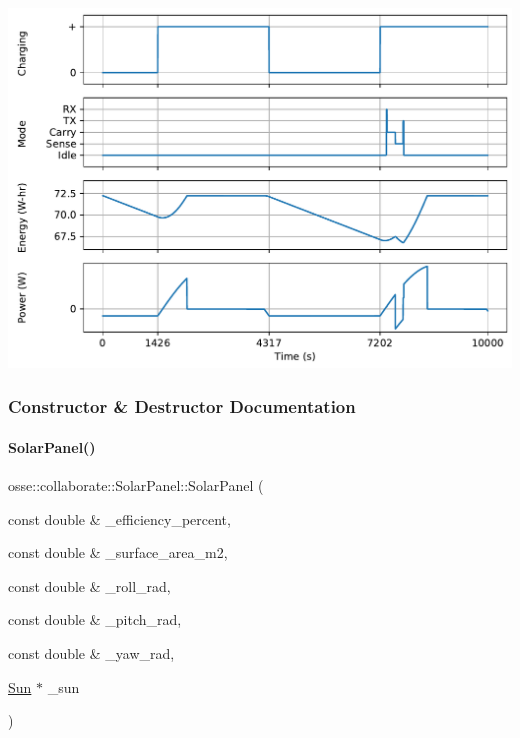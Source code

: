  
\begin{DoxyImageNoCaption}
  \mbox{\includegraphics[width=\textwidth]{power}}
\end{DoxyImageNoCaption}
 

\subsubsection{Constructor \& Destructor Documentation}
\mbox{\label{classosse_1_1collaborate_1_1_solar_panel_a060136ae41f3ce295647564b92450e1c}} 
\paragraph{\texorpdfstring{Solar\+Panel()}{SolarPanel()}}
{\footnotesize\ttfamily osse\+::collaborate\+::\+Solar\+Panel\+::\+Solar\+Panel (\begin{DoxyParamCaption}\item[{const double \&}]{\+\_\+efficiency\+\_\+percent,  }\item[{const double \&}]{\+\_\+surface\+\_\+area\+\_\+m2,  }\item[{const double \&}]{\+\_\+roll\+\_\+rad,  }\item[{const double \&}]{\+\_\+pitch\+\_\+rad,  }\item[{const double \&}]{\+\_\+yaw\+\_\+rad,  }\item[{\hyperlink{classosse_1_1collaborate_1_1_sun}{Sun} $\ast$}]{\+\_\+sun }\end{DoxyParamCaption})}



